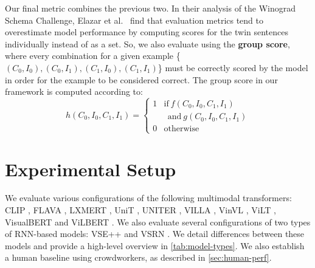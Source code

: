 \documentclass[10pt,twocolumn,letterpaper]{article}
\begin{document}
Our final metric combines the previous two. In their analysis of the Winograd Schema Challenge, Elazar et al.~\cite{elazar2021back} find that evaluation metrics tend to overestimate model performance by computing scores for the twin sentences individually instead of as a set. So, we also evaluate using the \textbf{group score}, where every combination for a given example \{$(C_{0}, I_{0}), (C_{0}, I_{1}), (C_{1}, I_{0}), (C_{1}, I_{1})$\} must be correctly scored by the model in order for the example to be considered correct.
The group score in our framework is computed according to:
\begin{equation}\label{eq:group-score}
        h(C_{0},I_{0},C_{1},I_{1})= 
    \begin{cases}
        1 & \text{if}\  f(C_{0},I_{0},C_{1},I_{1})  \\
         & \ \ \text{and}\ g(C_{0},I_{0},C_{1},I_{1})\\
        0              & \text{otherwise}
    \end{cases}
\end{equation}



\section{Experimental Setup}

We evaluate various configurations of the following multimodal transformers: CLIP \cite{radford2021clip}, FLAVA \cite{singh2022flava}, LXMERT \cite{tan2020lxmert}, UniT \cite{hu2021unit}, UNITER \cite{chen2020uniter}, VILLA \cite{gan2020villa}, VinVL \cite{zhang2021vinvl}, ViLT \cite{kim2021vilt}, VisualBERT \cite{li2019visualbert} and ViLBERT \cite{lu2019vilbert}. We also evaluate several configurations of two types of RNN-based models: VSE++ \cite{faghri2018vse} and VSRN \cite{li2019vsrn}.
We detail differences between these models and provide a high-level overview in \cref{tab:model-types}.
We also establish a human baseline using crowdworkers, as described in \cref{sec:human-perf}.
\end{document}
